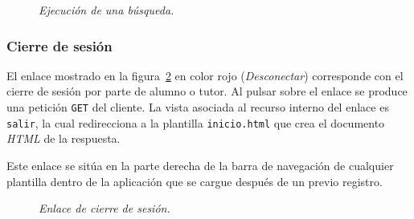 \documentclass[a4paper, 12pt]{book}
\begin{document}
\begin{itemize}
  \begin{figure}
    \centering
    \caption{\textit{Ejecuci\'on de una b\'usqueda.}}
    \label{fig:buscarajax}
  \end{figure}
  
\end{itemize}





\subsubsection{Cierre de sesi\'on} 
\label{sec:cierresesion}
El enlace mostrado en la figura~\ref{fig:cierresesion} en color rojo (\textit{Desconectar}) corresponde con el cierre de sesi\'on por parte de alumno o 
tutor. Al pulsar sobre el enlace se produce una petici\'on \texttt{GET} del cliente. La vista asociada al recurso interno del enlace es \texttt{salir}, la cual 
redirecciona a la plantilla \texttt{inicio.html} que crea el documento \textit{HTML} de la respuesta.

Este enlace se sit\'ua en la parte derecha de la barra de navegaci\'on de cualquier plantilla dentro de la aplicaci\'on que se cargue despu\'es de un previo
registro.
\begin{figure}
  \centering
  \caption{\textit{Enlace de cierre de sesi\'on.}}
  \label{fig:cierresesion}
\end{figure}
\end{document}
